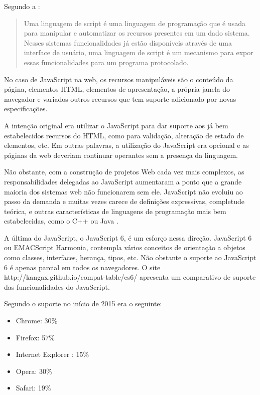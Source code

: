Segundo a \cite{ecmaSpecificaton}:
\begin{quote}
Uma linguagem de script é uma linguagem de programação que é
usada para manipular e automatizar os recursos presentes em um dado
sistema. Nesses sistemas funcionalidades já estão disponíveis
através de uma interface de usuário, uma linguagem de script é
um mecanismo para expor essas funcionalidades para um programa
protocolado.
\end{quote}

No caso de JavaScript na web, os recursos manipuláveis são o conteúdo
da página, elementos HTML, elementos de apresentação,
a própria janela do navegador e variados outros recursos que tem
suporte adicionado por novas especificações.

A intenção original era utilizar o JavaScript para dar suporte aos já
bem estabelecidos recursos do HTML, como para validação, alteração
de estado de elementos, etc. Em outras palavras, a utilização do
JavaScript era opcional e as páginas da web deveriam continuar
operantes sem a presença da linguagem.

Não obstante, com a construção de projetos Web cada vez mais complexos, as
responsabilidades delegadas ao JavaScript aumentaram a ponto que a
grande maioria dos sistemas web não funcionarem sem ele.
JavaScript não evoluiu ao passo da demanda e muitas vezes carece de
definições expressivas, completude teórica, e outras características
de linguagens de programação mais bem estabelecidas, como o C++ ou
Java \autocite{crossPlatformMobileGame}.

A última do JavaScript, o JavaScript 6, é um esforço nessa direção.
JavaScript 6 ou EMACScript Harmonia, contempla vários conceitos de
orientação a objetos como classes, interfaces, herança, tipos, etc.
Não obstante o suporte ao JavaScript 6 é apenas parcial em todos
os navegadores. O site http://kangax.github.io/compat-table/es6/
apresenta um comparativo de suporte das funcionalidades do JavaScript.

Segundo \cite{ecmaSupport} o suporte no início de 2015 era o seguinte:

\begin{itemize}
    \item Chrome: 30\%
    \item Firefox: 57\%
    \item Internet Explorer : 15\%
    \item Opera: 30\%
    \item Safari: 19\%
\end{itemize}

